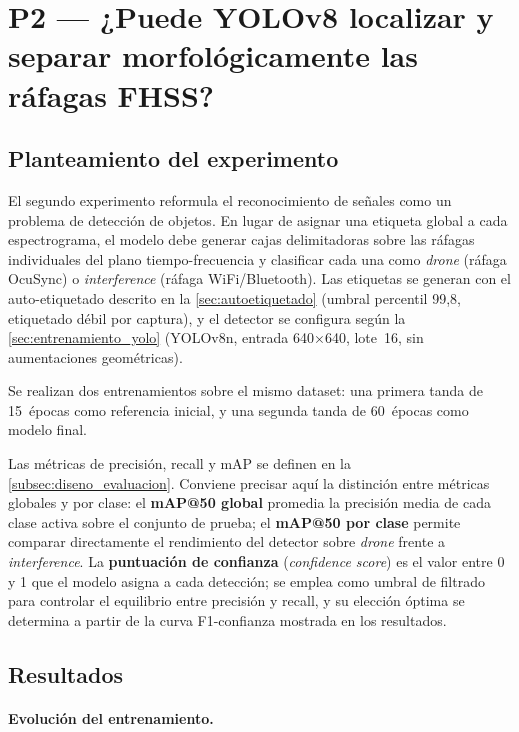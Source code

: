 \section{P2 --- ¿Puede YOLOv8 localizar y separar morfológicamente las ráfagas FHSS?}
\label{sec:bloque_yolo}

\subsection{Planteamiento del experimento}
\label{sec:p2_planteamiento}

El segundo experimento reformula el reconocimiento de señales como un problema de detección de objetos. En lugar de asignar una etiqueta global a cada espectrograma, el modelo debe generar cajas delimitadoras sobre las ráfagas individuales del plano tiempo-frecuencia y clasificar cada una como \emph{drone} (ráfaga OcuSync) o \emph{interference} (ráfaga WiFi/Bluetooth). Las etiquetas se generan con el auto-etiquetado descrito en la \cref{sec:autoetiquetado} (umbral percentil 99,8, etiquetado débil por captura), y el detector se configura según la \cref{sec:entrenamiento_yolo} (YOLOv8n, entrada 640×640, lote~16, sin aumentaciones geométricas).

Se realizan dos entrenamientos sobre el mismo dataset: una primera tanda de \num{15}~épocas como referencia inicial, y una segunda tanda de \num{60}~épocas como modelo final.

Las métricas de precisión, recall y mAP se definen en la \cref{subsec:diseno_evaluacion}. Conviene precisar aquí la distinción entre métricas globales y por clase: el \textbf{mAP@50 global} promedia la precisión media de cada clase activa sobre el conjunto de prueba; el \textbf{mAP@50 por clase} permite comparar directamente el rendimiento del detector sobre \emph{drone} frente a \emph{interference}. La \textbf{puntuación de confianza} (\emph{confidence score}) es el valor entre 0 y 1 que el modelo asigna a cada detección; se emplea como umbral de filtrado para controlar el equilibrio entre precisión y recall, y su elección óptima se determina a partir de la curva F1-confianza mostrada en los resultados.

\subsection{Resultados}
\label{sec:p2_resultados}

\paragraph{Evolución del entrenamiento.}

